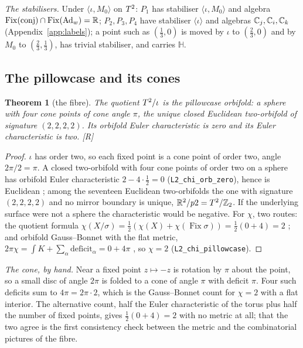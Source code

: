 \documentclass[11pt,a4paper]{article}
\theoremstyle{plain}
\newtheorem{theorem}{Theorem}[section]
\theoremstyle{definition}
\theoremstyle{remark}
\newcommand{\Hquat}{\mathbb{H}}
\newcommand{\Ad}{\operatorname{Ad}}
\newcommand{\Fix}{\operatorname{Fix}}
\newcommand{\rigR}{[\textup{R}]}
\begin{document}
\emph{The stabilisers.} Under $\langle\iota,M_{0}\rangle$ on $T^2$: $P_{1}$ has stabiliser $\langle\iota,M_{0}\rangle$ and algebra $\Fix(\text{conj})\cap\Fix(\Ad_{w})=\R$; $P_{2},P_{3},P_{4}$ have stabiliser $\langle\iota\rangle$ and algebras $\mathbb{C}_{j},\mathbb{C}_{i},\mathbb{C}_{k}$ (Appendix~\ref{app:labels}); a point such as $(\tfrac13,0)$ is moved by $\iota$ to $(\tfrac23,0)$ and by $M_{0}$ to $(\tfrac23,\tfrac13)$, has trivial stabiliser, and carries $\Hquat$.

\subsection{The pillowcase and its cones}

\begin{theorem}[the fibre]\label{thm:fibre}
The quotient $T^2/\iota$ is the pillowcase orbifold: a sphere with four cone points of cone angle $\pi$, the unique closed Euclidean two-orbifold of signature $(2,2,2,2)$. Its orbifold Euler characteristic is zero and its Euler characteristic is two. \rigR
\end{theorem}

\begin{proof}
$\iota$ has order two, so each fixed point is a cone point of order two, angle $2\pi/2=\pi$. A closed two-orbifold with four cone points of order two on a sphere has orbifold Euler characteristic $2-4\cdot\tfrac12=0$ (\texttt{L2\_chi\_orb\_zero}), hence is Euclidean \cite{Thurston}; among the seventeen Euclidean two-orbifolds the one with signature $(2,2,2,2)$ and no mirror boundary is unique, $\mathbb{R}^{2}/p2=T^2/\mathbb{Z}_2$. If the underlying surface were not a sphere the characteristic would be negative. For $\chi$, two routes: the quotient formula $\chi(X/\sigma)=\tfrac12(\chi(X)+\chi(\Fix\sigma))=\tfrac12(0+4)=2$ \cite{Bredon}; and orbifold Gauss--Bonnet with the flat metric, $2\pi\chi=\int K+\sum_{\alpha}\mathrm{deficit}_{\alpha}=0+4\pi$ \cite{Satake,Kawasaki1978}, so $\chi=2$ (\texttt{L2\_chi\_pillowcase}).
\end{proof}

\emph{The cone, by hand.} Near a fixed point $z\mapsto-z$ is rotation by $\pi$ about the point, so a small disc of angle $2\pi$ is folded to a cone of angle $\pi$ with deficit $\pi$. Four such deficits sum to $4\pi=2\pi\cdot2$, which is the Gauss--Bonnet count for $\chi=2$ with a flat interior. The alternative count, half the Euler characteristic of the torus plus half the number of fixed points, gives $\tfrac12(0+4)=2$ with no metric at all; that the two agree is the first consistency check between the metric and the combinatorial pictures of the fibre.
\end{document}
